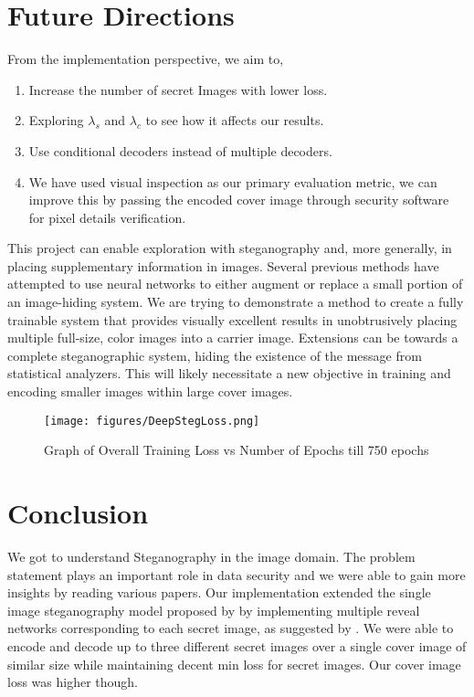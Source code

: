 \documentclass{article}
\begin{document}
\section{Future Directions}
From the implementation perspective, we aim to,
\begin{enumerate}
\itemsep0em 
\item Increase the number of secret Images with lower loss.
\item Exploring $\lambda_s$ and $\lambda_c$ to see how it affects our results.
\item Use conditional decoders instead of multiple decoders.
\item We have used visual inspection as our primary evaluation metric, we can improve this by passing the encoded cover image through security software for pixel details verification.
\end{enumerate}

This project can enable exploration with steganography and, more generally, in placing supplementary information in images. Several previous methods have attempted to use neural networks to either augment or replace a small portion of an image-hiding system. We are trying to demonstrate a method to create a fully trainable system that provides visually excellent results in unobtrusively placing multiple full-size, color images into a carrier image. Extensions can be towards a complete steganographic system, hiding the existence of the message from statistical analyzers. This will likely necessitate a new objective in training and encoding smaller images within large cover images.

\begin{figure}[t]
\vskip 0.2in
\begin{center}
\centerline{\texttt{[image: figures/DeepStegLoss.png]}}
\caption{Graph of Overall Training Loss vs Number of Epochs till 750 epochs}
\label{fig:LossGraph}
\end{center}
\vskip -0.4in
\end{figure}

\section{Conclusion}
We got to understand Steganography in the image domain. The problem statement plays an important role in data security and we were able to gain more insights by reading various papers. Our implementation extended the single image steganography model proposed by \cite{NIPS2017_6802} by implementing multiple reveal networks corresponding to each secret image, as suggested by \cite{kreuk2019hide}. We were able to encode and decode up to three different secret images over a single cover image of similar size while maintaining decent min loss for secret images. Our cover image loss was higher though.
\end{document}
